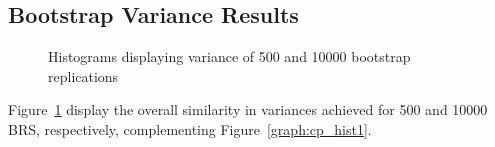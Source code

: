 \subsection{Bootstrap Variance Results}

\begin{figure}
\begin{minipage}{7cm}
\centerline{}
\end{minipage}
\hfill
\begin{minipage}{7cm}
\centerline{}
\end{minipage}
\caption{\label{graph:histo2} {Histograms displaying variance of 500 and 10000 bootstrap replications}}
\end{figure}

Figure~\ref{graph:histo2} display the overall similarity in variances
achieved for 500 and 10000 BRS, respectively, complementing
Figure~\ref{graph:cp_hist1}.


